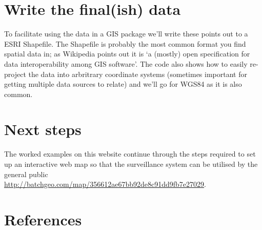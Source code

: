 \documentclass[a4paper]{article}
\begin{document}
\section{Write the final(ish) data}
\label{sec-9}

To facilitate using the data in a GIS package we'll write these points out to a ESRI Shapefile.  The Shapefile is probably the most common format you find spatial data in; as Wikipedia points out it is `a (mostly) open specification for data interoperability among GIS software'.  The code also shows how to easily re-project the data into arbritrary coordinate systems (sometimes important for getting multiple data sources to relate) and we'll go for WGS84 as it is also common. 
\section{Next steps}
\label{sec-10}

The worked examples on this website continue through the steps required to set up an interactive web map so that the surveillance system can be utilised by the general public \\
\href{http://batchgeo.com/map/356612ae67bb92de8c91dd9fb7e27029}{http://batchgeo.com/map/356612ae67bb92de8c91dd9fb7e27029}.  
\section{References}
\label{sec-11}

\end{document}
